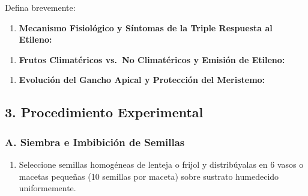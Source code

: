 \documentclass[
  spanish,
  10pt,
  letterpaper,
  twocolumn]{article}
\providecommand{\tightlist}{%
  \setlength{\itemsep}{0pt}\setlength{\parskip}{0pt}}
\begin{document}
Defina brevemente:

\begin{enumerate}
\def\labelenumi{\arabic{enumi}.}
\tightlist
\item
  \textbf{Mecanismo Fisiológico y Síntomas de la Triple Respuesta al
  Etileno:}
\end{enumerate}

\hrulefill

\hrulefill

\hrulefill

\hrulefill

\hrulefill

\hrulefill

\begin{enumerate}
\def\labelenumi{\arabic{enumi}.}
\setcounter{enumi}{1}
\tightlist
\item
  \textbf{Frutos Climatéricos vs.~No Climatéricos y Emisión de Etileno:}
\end{enumerate}

\hrulefill

\hrulefill

\hrulefill

\hrulefill

\hrulefill

\hrulefill

\begin{enumerate}
\def\labelenumi{\arabic{enumi}.}
\setcounter{enumi}{2}
\tightlist
\item
  \textbf{Evolución del Gancho Apical y Protección del Meristemo:}
\end{enumerate}

\hrulefill

\hrulefill

\hrulefill

\hrulefill

\hrulefill

\hrulefill

\subsection{3. Procedimiento
Experimental}\label{procedimiento-experimental}

\subsubsection{A. Siembra e Imbibición de
Semillas}\label{a.-siembra-e-imbibiciuxf3n-de-semillas}

\begin{enumerate}
\def\labelenumi{\arabic{enumi}.}
\tightlist
\item
  Seleccione semillas homogéneas de lenteja o frijol y distribúyalas en
  6 vasos o macetas pequeñas (10 semillas por maceta) sobre sustrato
  humedecido uniformemente.
\end{enumerate}
\end{document}
